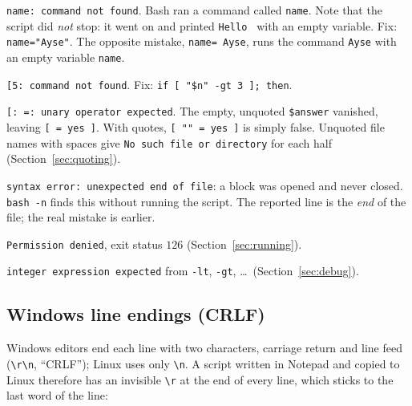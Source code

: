 \documentclass[11pt,a4paper]{article}
\newcommand{\cmd}[1]{\texttt{#1}}
\begin{document}
\begin{description}[leftmargin=0pt,itemsep=0.3em]
  \item[Spaces around \texttt{=}] \texttt{name: command not found}. Bash ran a command called \texttt{name}. Note that the script did \emph{not} stop: it went on and printed \texttt{Hello } with an empty variable. Fix: \texttt{name="Ayse"}. The opposite mistake, \texttt{name= Ayse}, runs the command \texttt{Ayse} with an empty variable \texttt{name}.
  \item[No spaces inside \texttt{[ ]}] \texttt{[5: command not found}. Fix: \texttt{if [ "\$n" -gt 3 ]; then}.
  \item[Missing quotes] \texttt{[: =: unary operator expected}. The empty, unquoted \texttt{\$answer} vanished, leaving \texttt{[ = yes ]}. With quotes, \texttt{[ "" = yes ]} is simply false. Unquoted file names with spaces give \texttt{No such file or directory} for each half (Section~\ref{sec:quoting}).
  \item[Missing \texttt{fi}, \texttt{done} or quote] \texttt{syntax error: unexpected end of file}: a block was opened and never closed. \cmd{bash -n} finds this without running the script. The reported line is the \emph{end} of the file; the real mistake is earlier.
  \item[Missing \texttt{chmod +x}] \texttt{Permission denied}, exit status $126$ (Section~\ref{sec:running}).
  \item[Not a number] \texttt{integer expression expected} from \texttt{-lt}, \texttt{-gt}, \ldots\ (Section~\ref{sec:debug}).
\end{description}

\subsection{Windows line endings (CRLF)}

Windows editors end each line with two characters, carriage return and line feed (\texttt{\textbackslash r\textbackslash n}, “CRLF”); Linux uses only \texttt{\textbackslash n}. A script written in Notepad and copied to Linux therefore has an invisible \texttt{\textbackslash r} at the end of every line, which sticks to the last word of the line:


\end{document}

